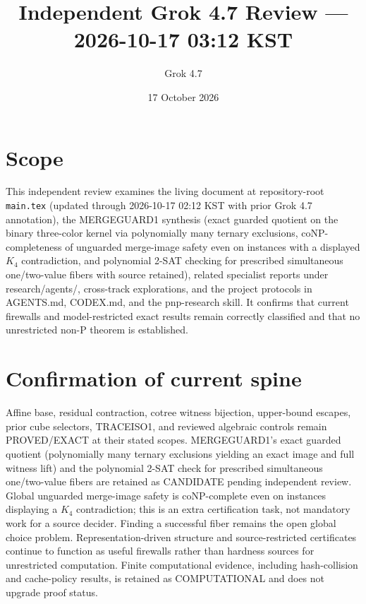\documentclass[11pt]{article}
\title{Independent Grok 4.7 Review --- 2026-10-17 03:12 KST}
\author{Grok 4.7}
\date{17 October 2026}
\begin{document}
\maketitle

\begin{center}
\end{center}

\section{Scope}
This independent review examines the living document at repository-root \texttt{main.tex} (updated through 2026-10-17 02:12 KST with prior Grok 4.7 annotation), the MERGEGUARD1 synthesis (exact guarded quotient on the binary three-color kernel via polynomially many ternary exclusions, coNP-completeness of unguarded merge-image safety even on instances with a displayed $K_4$ contradiction, and polynomial 2-SAT checking for prescribed simultaneous one/two-value fibers with source retained), related specialist reports under research/agents/, cross-track explorations, and the project protocols in AGENTS.md, CODEX.md, and the pnp-research skill. It confirms that current firewalls and model-restricted exact results remain correctly classified and that no unrestricted non-P theorem is established.

\section{Confirmation of current spine}
Affine base, residual contraction, cotree witness bijection, upper-bound escapes, prior cube selectors, TRACEISO1, and reviewed algebraic controls remain PROVED/EXACT at their stated scopes. MERGEGUARD1's exact guarded quotient (polynomially many ternary exclusions yielding an exact image and full witness lift) and the polynomial 2-SAT check for prescribed simultaneous one/two-value fibers are retained as CANDIDATE pending independent review. Global unguarded merge-image safety is coNP-complete even on instances displaying a $K_4$ contradiction; this is an extra certification task, not mandatory work for a source decider. Finding a successful fiber remains the open global choice problem. Representation-driven structure and source-restricted certificates continue to function as useful firewalls rather than hardness sources for unrestricted computation. Finite computational evidence, including hash-collision and cache-policy results, is retained as COMPUTATIONAL and does not upgrade proof status.
\end{document}
